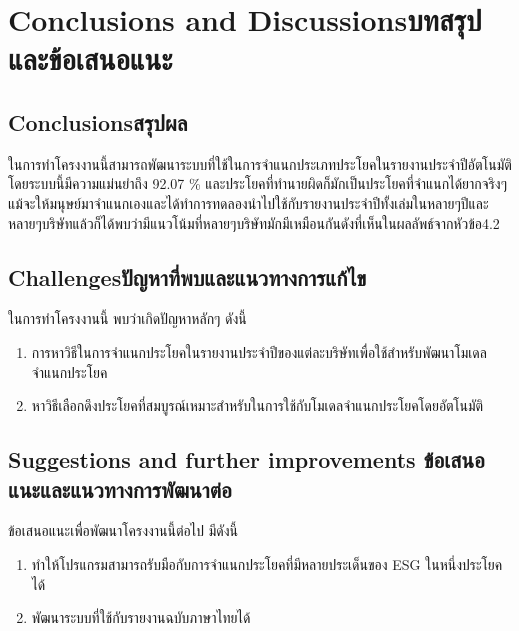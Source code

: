 \chapter{\ifenglish Conclusions and Discussions\else บทสรุปและข้อเสนอแนะ\fi}

\section{\ifenglish Conclusions\else สรุปผล\fi}

\enskip \enskip \enskip ในการทำโครงงานนี้สามารถพัฒนาระบบที่ใช้ในการจำแนกประเภทประโยคในรายงานประจำปีอัตโนมัติ
โดยระบบนี้มีความแม่นยำถึง 92.07 \% และประโยคที่ทำนายผิดก็มักเป็นประโยคที่จำแนกได้ยากจริงๆแม้จะให้มนุษย์มาจำแนกเองและได้ทำการทดลองนำไปใช้กับรายงานประจำปีทั้งเล่มในหลายๆปีและหลายๆบริษัทแล้วก็ได้พบว่ามีแนวโน้มที่หลายๆบริษัทมักมีเหมือนกันดังที่เห็นในผลลัพธ์จากหัวข้อ4.2



\section{\ifenglish Challenges\else ปัญหาที่พบและแนวทางการแก้ไข\fi}

\enskip \enskip \enskip ในการทำโครงงานนี้ พบว่าเกิดปัญหาหลักๆ ดังนี้


\begin{enumerate} 
    \item
    การหาวิธีในการจำแนกประโยคในรายงานประจำปีของแต่ละบริษัทเพื่อใช้สำหรับพัฒนาโมเดลจำแนกประโยค
    \item
    หาวิธีเลือกดึงประโยคที่สมบูรณ์เหมาะสำหรับในการใช้กับโมเดลจำแนกประโยคโดยอัตโนมัติ
\end{enumerate}

\section{\ifenglish%
Suggestions and further improvements
\else%
ข้อเสนอแนะและแนวทางการพัฒนาต่อ
\fi
}

\enskip \enskip \enskip ข้อเสนอแนะเพื่อพัฒนาโครงงานนี้ต่อไป มีดังนี้


\begin{enumerate} 
    \item
    ทำให้โปรแกรมสามารถรับมือกับการจำแนกประโยคที่มีหลายประเด็นของ ESG ในหนึ่งประโยคได้
    \item
    พัฒนาระบบที่ใช้กับรายงานฉบับภาษาไทยได้
\end{enumerate}
